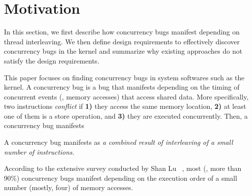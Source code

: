 \section{Motivation}
\label{s:motivation}


In this section, we first describe how concurrency bugs manifest
depending on thread interleaving.
%
We then define design requirements to effectively discover concurrency
bugs in the kernel and summarize why existing approaches do not
satisfy the design requirements.


%
This paper focuses on finding concurrency bugs in system softwares
such as the kernel.
%
A concurrency bug is a bug that manifests depending on the timing of
concurrent events (\eg, memory accesses) that access shared data.
%
More specifically, two instructions \textit{conflict} if \textbf{1)}
they access the same memory location, \textbf{2)} at least one of them
is a store operation, and \textbf{3)} they are executed concurrently.
%
Then, a concurrency bug manifests 


A concurrency bug manifests as \textit{a combined result of
  interleaving of a small number of instructions.}




According to the extensive survey conducted by Shan Lu
\etal~\cite{learningfrommistakes}, most (\ie, more than 90\%)
concurrency bugs manifest depending on the execution order of a small
number (mostly, four) of memory accesses.




